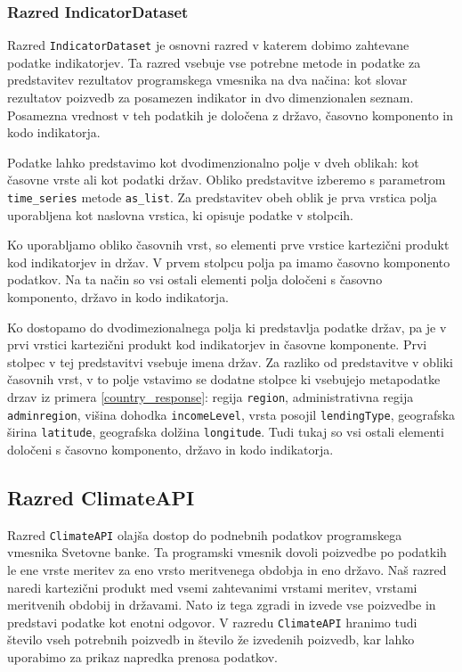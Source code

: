 \subsubsection{Razred IndicatorDataset}
\label{razred_indicatordatasets}

Razred \verb|IndicatorDataset| je osnovni razred v katerem dobimo zahtevane 
podatke indikatorjev. Ta razred vsebuje vse potrebne metode in podatke za 
predstavitev rezultatov programskega vmesnika na dva načina: kot slovar
rezultatov poizvedb za posamezen indikator in dvo dimenzionalen seznam. 
Posamezna vrednost v teh podatkih je določena z državo, časovno komponento in 
kodo indikatorja. 

Podatke lahko predstavimo kot dvodimenzionalno polje v dveh oblikah: kot
časovne vrste ali kot podatki držav. Obliko predstavitve izberemo s
parametrom \verb|time_series| metode \verb|as_list|. Za predstavitev obeh oblik
je prva vrstica polja uporabljena kot naslovna vrstica, ki opisuje podatke v 
stolpcih.

Ko uporabljamo obliko časovnih vrst, so elementi prve vrstice kartezični
produkt kod indikatorjev in držav. V prvem stolpcu polja pa imamo časovno
komponento podatkov. Na ta način so vsi ostali elementi polja določeni s 
časovno komponento, državo in kodo indikatorja.

Ko dostopamo do dvodimezionalnega polja ki predstavlja podatke držav, pa je v
prvi vrstici kartezični produkt kod indikatorjev in časovne komponente. Prvi
stolpec v tej predstavitvi vsebuje imena držav. Za razliko od predstavitve v 
obliki časovnih vrst, v to polje vstavimo se dodatne stolpce ki vsebujejo
metapodatke drzav iz primera \ref{country_response}: regija \verb|region|, 
administrativna regija \verb|adminregion|, višina dohodka \verb|incomeLevel|, 
vrsta posojil \verb|lendingType|, geografska širina \verb|latitude|, 
geografska dolžina \verb|longitude|. Tudi tukaj so vsi ostali elementi določeni s
časovno komponento, državo in kodo indikatorja. 


\subsection{Razred ClimateAPI}

Razred \verb|ClimateAPI| olajša dostop do podnebnih podatkov programskega
vmesnika Svetovne banke. Ta programski vmesnik dovoli poizvedbe po podatkih le 
ene vrste meritev za eno vrsto meritvenega obdobja in eno državo. Naš razred 
naredi kartezični produkt med vsemi zahtevanimi vrstami meritev, vrstami
meritvenih obdobij in državami. Nato iz tega zgradi in izvede vse poizvedbe 
in predstavi podatke kot enotni odgovor. V razredu \verb|ClimateAPI| hranimo 
tudi število vseh potrebnih poizvedb in število že izvedenih poizvedb, kar 
lahko uporabimo za prikaz napredka prenosa podatkov.



